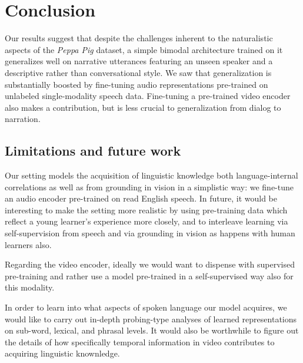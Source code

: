 \section{Conclusion}
\label{sec:conclusion}
Our results suggest that despite the challenges inherent to the
naturalistic aspects of the \emph{Peppa Pig} dataset, a simple bimodal
architecture trained on it generalizes well on narrative utterances
featuring an unseen speaker and a descriptive rather than
conversational style. We saw that generalization is substantially
boosted by fine-tuning audio representations pre-trained on unlabeled
single-modality speech data. Fine-tuning a pre-trained video encoder
also makes a contribution, but is less crucial to generalization from
dialog to narration.


\subsection{Limitations and future work}
\label{sec:limitations}
Our setting models the acquisition of linguistic knowledge both
language-internal correlations as well as from grounding in vision in
a simplistic way: we fine-tune an audio encoder pre-trained on read
English speech. In future, it would be interesting to make the setting
more realistic by using pre-training data which reflect a young
learner's experience more closely, and to interleave learning via
self-supervision from speech and via grounding in vision as happens
with human learners also.

Regarding the video encoder, ideally we would want to dispense with
supervised pre-training and rather use a model pre-trained in a
self-supervised way also for this modality.

In order to learn into what aspects of spoken language our model
acquires, we would like to carry out in-depth probing-type
analyses of learned representations on sub-word, lexical, and phrasal
levels. It would also be worthwhile to figure out the details of how
specifically temporal information in video contributes to acquiring
linguistic knownledge.




